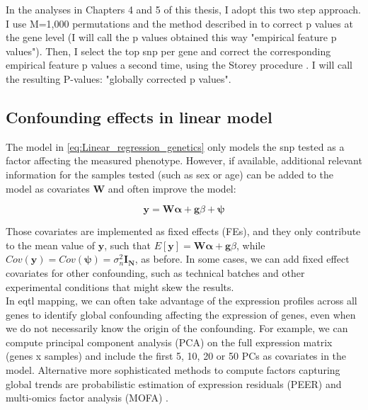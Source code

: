 In the analyses in Chapters 4 and 5 of this thesis, I adopt this two step approach.
I use M=1,000 permutations and the method described in \cite{ongen2016fast} to correct p values at the gene level (I will call the p values obtained this way "empirical feature p values").
Then, I select the top \gls{snp} per gene and correct the corresponding empirical feature p values a second time, using the Storey procedure \cite{storey2002direct}.
I will call the resulting P-values: "globally corrected p values".

\subsection{Confounding effects in linear model}

The model in \eqref{eq:Linear_regression_genetics} only models the \gls{snp} tested as a factor affecting the measured phenotype.
However, if available, additional relevant information for the samples tested (such as sex or age) can be added to the model as covariates $\mathbf{W}$ and often improve the model:

\begin{equation}\label{eq:Linear_regression_genetics_covariates}
 \mathbf{y} =  \mathbf{W}\boldsymbol{\alpha} + \mathbf{g}\beta + \boldsymbol{\psi} 
\end{equation}

Those covariates are implemented as fixed effects (FEs), and they only contribute to the mean value of $\mathbf{y}$, such that $E[\mathbf{y}] = \mathbf{W}\boldsymbol{\alpha} + \mathbf{g}\beta$, while $Cov(\mathbf{y}) = Cov(\boldsymbol{\psi}) = \sigma_n^2 \mathbf{I_N} $, as before.
In some cases, we can add fixed effect covariates for other confounding, such as technical batches and other experimental conditions that might skew the results. \\

In e\gls{qtl} mapping, we can often take advantage of the expression profiles across all genes to identify global confounding affecting the expression of genes, even when we do not necessarily know the origin of the confounding.
For example, we can compute principal component analysis (PCA) on the full expression matrix (genes x samples) and include the first 5, 10, 20 or 50 PCs as covariates in the model.
Alternative more sophisticated methods to compute factors capturing global trends are probabilistic estimation of expression residuals (PEER) \cite{stegle2010bayesian, stegle2012using} and multi-omics factor analysis (MOFA) \cite{argelaguet2018multi}. 

